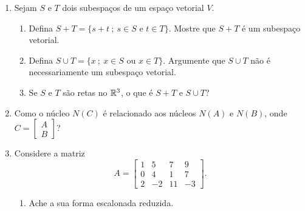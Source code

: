 \documentclass[leqno]{article}
\numberwithin{equation}{section}
\begin{document}
\begin{enumerate}

    \item Sejam $S$ e $T$ dois subespaços de um espaço vetorial $V$.

        \begin{enumerate}

            \item Defina $S + T = \{s + t \ ; \ s \in S \mbox{ e } t \in T\}$. Mostre que $S + T$ é um subespaço vetorial.
	
	\begin{sol} 
	\end{sol} 

            \item Defina $S \cup T = \{x \ ; \ x \in S \mbox{ ou } x \in T\}$. Argumente que $S \cup T$ não é necessariamente um subespaço vetorial.
	
	\begin{sol} 
	\end{sol} 

            \item Se $S$ e $T$ são retas no $\mathbb{R}^3$, o que é $S + T$ e $S \cup T$?
	
	\begin{sol} 
	\end{sol} 
        \end{enumerate}

    \item Como o núcleo $N(C)$ é relacionado aos núcleos $N(A)$ e $N(B)$, onde $C = \begin{bmatrix}A \\ B \end{bmatrix}$?
	
    \begin{sol} 
    \end{sol} 

    \item Considere a matriz
        $$A = \begin{bmatrix} 
            1 & 5 & 7 & 9\\
            0 & 4 & 1 & 7 \\
            2 & -2 & 11 & -3
        \end{bmatrix}.$$

        \begin{enumerate}

            \item Ache a sua forma escalonada reduzida.
	    

\end{enumerate}
\end{enumerate}
\end{document}
